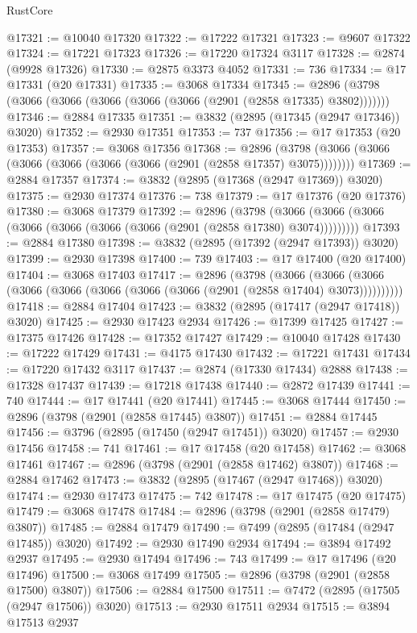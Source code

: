 \begin{lexlean}{RustCore}
\begin{coremodule}
@17321 := @10040 @17320
@17322 := @17222 @17321
@17323 := @9607 @17322
@17324 := @17221 @17323
@17326 := @17220 @17324 @3117
@17328 := @2874 (@9928 @17326)
@17330 := @2875 @3373 @4052
@17331 := 736
@17334 := @17 @17331 (@20 @17331)
@17335 := @3068 @17334
@17345 := @2896 (@3798 (@3066 (@3066 (@3066 (@3066 (@3066 (@2901 (@2858 @17335) @3802)))))))
@17346 := @2884 @17335
@17351 := @3832 (@2895 (@17345 (@2947 @17346)) @3020)
@17352 := @2930 @17351
@17353 := 737
@17356 := @17 @17353 (@20 @17353)
@17357 := @3068 @17356
@17368 := @2896 (@3798 (@3066 (@3066 (@3066 (@3066 (@3066 (@3066 (@2901 (@2858 @17357) @3075))))))))
@17369 := @2884 @17357
@17374 := @3832 (@2895 (@17368 (@2947 @17369)) @3020)
@17375 := @2930 @17374
@17376 := 738
@17379 := @17 @17376 (@20 @17376)
@17380 := @3068 @17379
@17392 := @2896
    (@3798 (@3066 (@3066 (@3066 (@3066 (@3066 (@3066 (@3066 (@2901 (@2858 @17380) @3074)))))))))
@17393 := @2884 @17380
@17398 := @3832 (@2895 (@17392 (@2947 @17393)) @3020)
@17399 := @2930 @17398
@17400 := 739
@17403 := @17 @17400 (@20 @17400)
@17404 := @3068 @17403
@17417 := @2896
    (@3798
      (@3066 (@3066 (@3066 (@3066 (@3066 (@3066 (@3066 (@3066 (@2901 (@2858 @17404) @3073))))))))))
@17418 := @2884 @17404
@17423 := @3832 (@2895 (@17417 (@2947 @17418)) @3020)
@17425 := @2930 @17423 @2934
@17426 := @17399 @17425
@17427 := @17375 @17426
@17428 := @17352 @17427
@17429 := @10040 @17428
@17430 := @17222 @17429
@17431 := @4175 @17430
@17432 := @17221 @17431
@17434 := @17220 @17432 @3117
@17437 := @2874 (@17330 @17434) @2888
@17438 := @17328 @17437
@17439 := @17218 @17438
@17440 := @2872 @17439
@17441 := 740
@17444 := @17 @17441 (@20 @17441)
@17445 := @3068 @17444
@17450 := @2896 (@3798 (@2901 (@2858 @17445) @3807))
@17451 := @2884 @17445
@17456 := @3796 (@2895 (@17450 (@2947 @17451)) @3020)
@17457 := @2930 @17456
@17458 := 741
@17461 := @17 @17458 (@20 @17458)
@17462 := @3068 @17461
@17467 := @2896 (@3798 (@2901 (@2858 @17462) @3807))
@17468 := @2884 @17462
@17473 := @3832 (@2895 (@17467 (@2947 @17468)) @3020)
@17474 := @2930 @17473
@17475 := 742
@17478 := @17 @17475 (@20 @17475)
@17479 := @3068 @17478
@17484 := @2896 (@3798 (@2901 (@2858 @17479) @3807))
@17485 := @2884 @17479
@17490 := @7499 (@2895 (@17484 (@2947 @17485)) @3020)
@17492 := @2930 @17490 @2934
@17494 := @3894 @17492 @2937
@17495 := @2930 @17494
@17496 := 743
@17499 := @17 @17496 (@20 @17496)
@17500 := @3068 @17499
@17505 := @2896 (@3798 (@2901 (@2858 @17500) @3807))
@17506 := @2884 @17500
@17511 := @7472 (@2895 (@17505 (@2947 @17506)) @3020)
@17513 := @2930 @17511 @2934
@17515 := @3894 @17513 @2937

\end{coremodule}
\end{lexlean}
